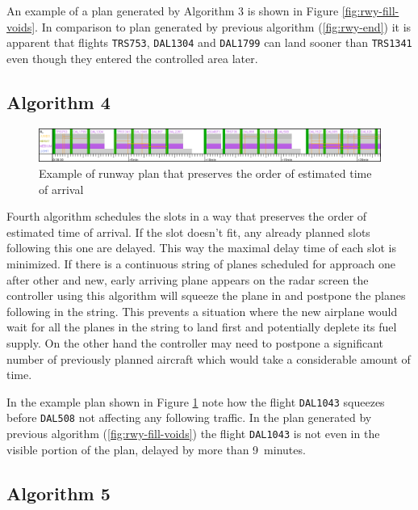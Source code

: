 An example of a plan generated by Algorithm 3 is shown in Figure \ref{fig:rwy-fill-voids}. In comparison to plan generated by previous algorithm (\ref{fig:rwy-end}) it is apparent that flights \texttt{TRS753}, \texttt{DAL1304} and \texttt{DAL1799} can land sooner than \texttt{TRS1341} even though they entered the controlled area later.

\subsection{Algorithm 4}

\begin{figure}[h]
    \centering
    \includegraphics[width=\textwidth]{figures/rwy-eta-order.png}
    \caption{Example of runway plan that preserves the order of estimated time of arrival}
    \label{fig:rwy-eta-order}
\end{figure}

Fourth algorithm schedules the slots in a way that preserves the order of estimated time of arrival. If the slot doesn't fit, any already planned slots following this one are delayed. This way the maximal delay time of each slot is minimized. If there is a continuous string of planes scheduled for approach one after other and new, early arriving plane appears on the radar screen the controller using this algorithm will squeeze the plane in and postpone the planes following in the string. This prevents a situation where the new airplane would wait for all the planes in the string to land first and potentially deplete its fuel supply. On the other hand the controller may need to postpone a significant number of previously planned aircraft which would take a considerable amount of time.

In the example plan shown in Figure \ref{fig:rwy-eta-order} note how the flight \texttt{DAL1043} squeezes before \texttt{DAL508} not affecting any following traffic. In the plan generated by previous algorithm (\ref{fig:rwy-fill-voids}) the flight \texttt{DAL1043} is not even in the visible portion of the plan, delayed by more than \mbox{9 minutes}.

\subsection{Algorithm 5}

